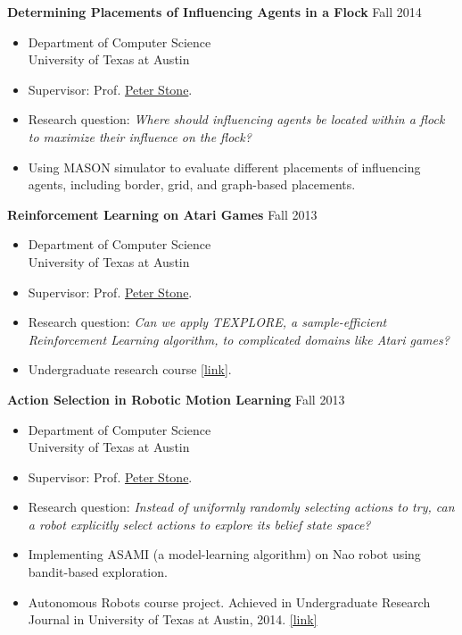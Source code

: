 \documentclass[10pt]{article}
\newenvironment{innerlist}[1][\enskip\textbullet]%
        {\begin{itemize}[#1,leftmargin=*,parsep=0pt,itemsep=0pt,topsep=0pt,partopsep=0pt]}
        {\end{itemize}}
\newcommand\webpage[1]{\href{http://cs.utexas.edu/~menie482/#1}{[link]}}
\begin{document}
\textbf{Determining Placements of Influencing Agents in a Flock} \hfill {Fall 2014}
\begin{innerlist}
\item[] Department of Computer Science\\
        University of Texas at Austin
\vspace{.05in}
\item Supervisor: Prof. \href{http://www.cs.utexas.edu/~pstone/}{Peter Stone}.
\item Research question: {\em Where should influencing agents be located within
a flock to maximize their influence on the flock?}
\item Using MASON simulator to evaluate different placements of influencing
agents, including border, grid, and graph-based placements.

\end{innerlist}
\vspace{.1in}

\textbf{Reinforcement Learning on Atari Games} \hfill {Fall 2013}
\begin{innerlist}
\item[] Department of Computer Science\\
        University of Texas at Austin
\vspace{.05in}
\item Supervisor: Prof. \href{http://www.cs.utexas.edu/~pstone/}{Peter Stone}.
\item Research question: {\em Can we apply TEXPLORE, a sample-efficient
Reinforcement Learning algorithm, to complicated domains like Atari games?}
\item Undergraduate research course \webpage{papers/texplore.pdf}.
\end{innerlist}
\vspace{.1in}

\textbf{Action Selection in Robotic Motion Learning} \hfill {Fall 2013}
\begin{innerlist}
\item[] Department of Computer Science\\
        University of Texas at Austin
\vspace{.05in}
\item Supervisor: Prof. \href{http://www.cs.utexas.edu/~pstone/}{Peter Stone}.
\item Research question: {\em Instead of uniformly randomly selecting actions to
try, can a robot explicitly select actions to explore its belief state space?}
\item Implementing ASAMI (a model-learning algorithm) on Nao robot using
bandit-based exploration.
\item Autonomous Robots course project. Achieved in Undergraduate Research
Journal in University of Texas at Austin, 2014. \webpage{papers/asami.pdf}
\end{innerlist}
\vspace{.1in}
\end{document}
